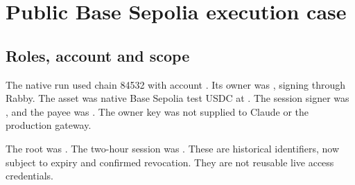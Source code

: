 \section{Public Base Sepolia execution case}\label{sec:publiccase}
\subsection{Roles, account and scope}
The native run used chain 84532 with account . Its owner was , signing through Rabby. The asset was native Base Sepolia test USDC at . The session signer was , and the payee was . The owner key was not supplied to Claude or the production gateway.\citep{case}

The root was . The two-hour session was . These are historical identifiers, now subject to expiry and confirmed revocation. They are not reusable live access credentials.

